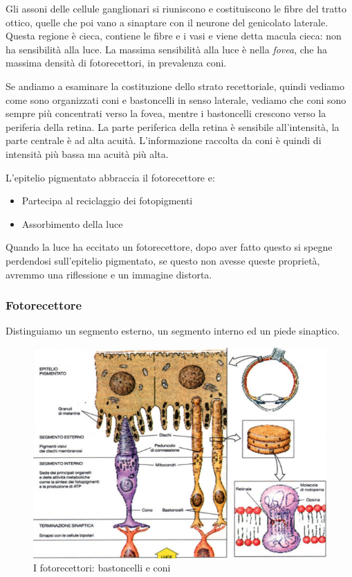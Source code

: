 \documentclass[a4paper,12pt]{article}
\begin{document}
Gli assoni delle cellule ganglionari si riuniscono e costituiscono le fibre del tratto ottico, quelle che poi vano a sinaptare con il neurone del genicolato laterale. Questa regione è cieca, contiene le fibre e i vasi e viene detta macula cieca: non ha sensibilità alla luce. La massima sensibilità alla luce è nella \emph{fovea}, che ha massima densità di fotorecettori, in prevalenza coni.

Se andiamo a esaminare la costituzione dello strato recettoriale, quindi vediamo come sono organizzati coni e bastoncelli in senso laterale, vediamo che coni sono sempre più concentrati verso la fovea, mentre i bastoncelli crescono verso la periferia della retina. La parte periferica della retina è sensibile all'intensità, la parte centrale è ad alta acuità. 
L'informazione raccolta da coni è quindi di intensità più bassa ma acuità più alta.  

L'epitelio pigmentato abbraccia il fotorecettore e:
\begin{itemize}
\item{Partecipa al reciclaggio dei fotopigmenti}
\item{Assorbimento della luce}
\end{itemize}

Quando la luce ha eccitato un fotorecettore, dopo aver fatto questo si spegne perdendosi sull'epitelio pigmentato, se questo non avesse queste proprietà, avremmo una riflessione e un immagine distorta.

\subsubsection{Fotorecettore}
Distinguiamo un segmento esterno, un segmento interno ed un piede sinaptico.

\begin{figure}[H]
\centering
\includegraphics[scale=0.45]{immagine/foto.jpg}
\caption{I fotorecettori: bastoncelli e coni}
\end{figure} 
\end{document}
